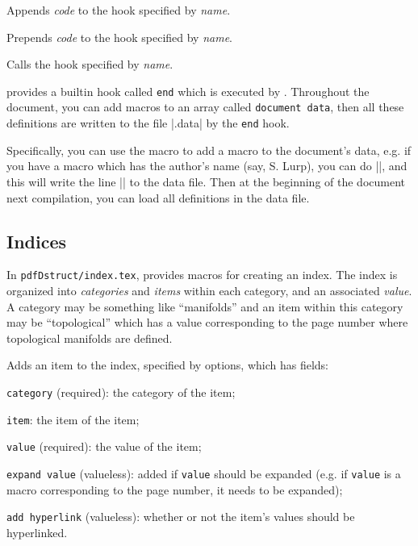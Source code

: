 Appends {\it code} to the hook specified by {\it name}.
\emacroexp

Prepends {\it code} to the hook specified by {\it name}.
\emacroexp

Calls the hook specified by {\it name}.
\emacroexp

\pdftoolbox{} provides a builtin hook called {\tt end} which is executed by \macro\bye.
Throughout the document, you can add macros to an array called {\tt document data}, then all these definitions are written to the file \inlinecode|\jobname.data| by the {\tt end} hook.

Specifically, you can use the \macro\docdata\anchormacro\docdata{} macro to add a macro to the document's data, e.g. if you have a macro \macro\name{} which has the author's name (say, S. Lurp), you can do
\inlinecode|\docdata\name|, and this will write the line \inlinecode|\gdef\name{S. Lurp}| to the data file.
Then at the beginning of the document next compilation, you can load all definitions in the data file.

\subsection{Indices}

In {\tt pdfDstruct/index.tex}, \pdftoolbox{} provides macros for creating an index.
The index is organized into {\it categories} and {\it items} within each category, and an associated {\it value}.
A category may be something like ``manifolds'' and an item within this category may be ``topological'' which has a value corresponding to the page number where topological manifolds are defined.

Adds an item to the index, specified by options, which has fields:
\benum
    \item {\tt category} (required): the category of the item;
    \item {\tt item}: the item of the item;
    \item {\tt value} (required): the value of the item;
    \item {\tt expand value} (valueless): added if {\tt value} should be expanded (e.g. if {\tt value} is a macro corresponding to the page number, it needs to be expanded);
    \item {\tt add hyperlink} (valueless): whether or not the item's values should be hyperlinked.
\eenum
\emacroexp

